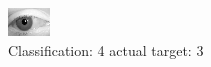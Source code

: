 \begin{figure}[h!]
\begin{center}
\includegraphics[width=0.60\columnwidth]{figures/ID2832_class_4_target_3.png}
\end{center}
\caption{ Classification: 4 actual target: 3}
\label{fig:ID2832_class_4_target_3}
\end{figure}
